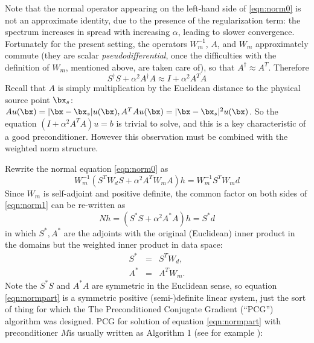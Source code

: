 Note that the normal operator appearing on the left-hand side of
\ref{eqn:norm0} is not an approximate identity, due to the presence of
the regularization term: the spectrum increases in spread with
increasing $\alpha$, leading to slower convergence. Fortunately for
the present setting, the operators $W_m^{-1}$, $A$, and $W_m$
approximately commute (they are scalar {\em pseudodifferential}, once
the difficulties with the definition of $W_m$, mentioned above, are
taken care of), so that $A^{\dagger} \approx A^T$. Therefore
\begin{equation}
  \label{eqn:normapprox}
  S^{\dagger}S + \alpha^2 A^{\dagger}A \approx I + \alpha^2A^TA
\end{equation}
Recall that $A$ is simply multiplication by the Euclidean distance to
the physical source point $\bx_s$: $A u (\bx) = |\bx-\bx_s|u(\bx),
A^TAu(\bx) = |\bx-\bx_s|^2u(\bx)$. So the equation $(I+\alpha^2
A^TA)u=b$ is trivial to solve, and this is a key characteristic of a
good preconditioner. However this observation must be combined with
the weighted norm structure.

Rewrite the normal equation \ref{eqn:norm0} as
\begin{equation}
  \label{eqn:norm1}
  W_m^{-1}(S^TW_dS + \alpha^2 A^TW_mA)h = W_m^{-1}S^TW_md 
\end{equation}
Since $W_m$ is self-adjoint and positive definite, the common factor on both sides of \ref{eqn:norm1} can be re-written as
\begin{equation}
  \label{eqn:normpart}
  Nh = (S^*S + \alpha^2 A^*A)h = S^*d 
\end{equation}
in which $S^*, A^*$ are the adjoints with the original (Euclidean)
inner product in the domains but the weighted inner product in data
space:
\begin{eqnarray}
  \label{eqn:sadj}
  S^* &=& S^T W_d,\\
  A^* &=& A^T W_m.
\end{eqnarray}
Note the $S^*S$ and $A^*A$ are symmetric in the Euclidean sense, so
equation \ref{eqn:normpart} is a symmetric positive (semi-)definite
linear system, just the sort of thing for which the 
The Preconditioned Conjugate Gradient (``PCG'') algorithm was
designed. PCG for solution
of equation \ref{eqn:normpart} with preconditioner $M$is usually
written as Algorithm 1 (see for example \cite{Golub:2012}):

